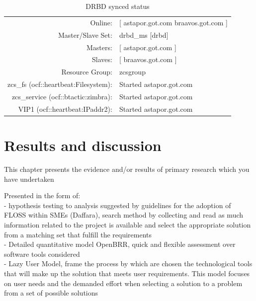\documentclass[a4paper, 12pt]{book}
\begin{document}
\FloatBarrier
\begin{table}[H]
  \centering
  \begin{tabular}{ | r l | }
    \hline
      Online:                   & [ astapor.got.com braavos.got.com ]\\
      Master/Slave Set: 		& 	drbd\_ms [drbd]\\
      Masters: 					& [ astapor.got.com ]\\
      Slaves: 					& [ braavos.got.com ]\\
      Resource Group: 			& zcsgroup\\
      zcs\_fs (ocf::heartbeat:Filesystem): & Started astapor.got.com\\
      zcs\_service (ocf::btactic:zimbra):  & Started astapor.got.com\\
      VIP1 (ocf::heartbeat:IPaddr2):       & Started astapor.got.com\\
    \hline
  \end{tabular}
\caption{DRBD synced status}
\label{table:sync}
\end{table}




%
\chapter{Results and discussion}
\label{chap:results}

This chapter presents the evidence and/or results of primary research which you have undertaken

\noindent Presented in the form of:\\

\noindent - hypothesis testing to analysis suggested by guidelines for the adoption of FLOSS within SMEs (Daffara), search method by collecting and read as much information related to the project is available and select the appropriate solution from a matching set that fulfill the requirements\\

\noindent - Detailed quantitative model OpenBRR, quick and flexible assessment over software tools considered\\

\noindent - Lazy User Model, frame the process by which are chosen the technological tools that will make up the solution that meets user requirements. This model focuses on user needs and the demanded effort when selecting a solution to a problem from a set of possible solutions
\end{document}
